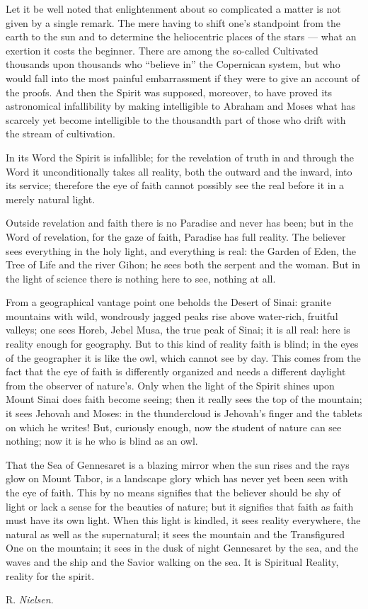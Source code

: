 \documentclass[12pt,a4paper,openany]{book}
\newcommand{\opage}[1]{\marginnote{\footnotesize\textit{[#1]}}}
\newcommand{\signature}[1]{\par\smallskip\hfill #1\hspace*{2em}\par}
\begin{document}
Let it be well noted that enlightenment about so
complicated a matter is not given by a single remark.
The mere having to shift one's standpoint from the earth
to the sun and to determine the heliocentric places of the stars
--- what an exertion it costs the beginner. There
are among the so-called Cultivated thousands upon thousands
who ``believe in'' the Copernican system, but who would
fall into the most painful embarrassment if they were to give
an account of the proofs. And then the Spirit was supposed, moreover,
\setcounter{footnote}{0}%
\opage{319}to have proved its astronomical infallibility by making
intelligible to Abraham and Moses what has scarcely yet
become intelligible to the thousandth part of those who
drift with the stream of cultivation.

In its Word the Spirit is infallible; for the revelation
of truth in and through the Word it unconditionally takes all
reality, both the outward and the inward, into
its service; therefore the eye of faith cannot possibly see the real
before it in a merely natural light.

Outside revelation and faith there is no Paradise
and never has been; but in the Word of revelation, for
the gaze of faith, Paradise has full reality. The believer
sees everything in the holy light, and everything is real: the Garden
of Eden, the Tree of Life and the river Gihon; he sees both
the serpent and the woman. But in the light of science there is
nothing here to see, nothing at all.

From a geographical vantage point one beholds the Desert of Sinai:
granite mountains with wild, wondrously jagged peaks rise
above water-rich, fruitful valleys; one sees Horeb,
Jebel Musa, the true peak of Sinai; it is all
real: here is reality enough for geography.
But to this kind of reality faith is blind; in
the eyes of the geographer it is like the owl, which cannot see by
day. This comes from the fact that the eye of faith is differently
organized and needs a different daylight from the observer of nature's.
Only when the light of the Spirit shines upon Mount
Sinai does faith become seeing; then it really sees the
top of the mountain; it sees Jehovah and Moses: in the thundercloud is
Jehovah's finger and the tablets on which he writes!
But, curiously enough, now the student of nature can see nothing;
now it is he who is blind as an owl.

\setcounter{footnote}{0}%
\opage{320}That the Sea of Gennesaret is a blazing mirror when the sun
rises and the rays glow on Mount Tabor, is a
landscape glory which has never yet been seen with the eye
of faith. This by no means signifies that the believer should be
shy of light or lack a sense for the beauties of nature; but it
signifies that faith as faith must have its own light.
When this light is kindled, it sees reality everywhere,
the natural as well as the supernatural; it sees
the mountain and the Transfigured One on the mountain; it sees in
the dusk of night Gennesaret by the sea, and the waves and
the ship and the Savior walking on the sea. It is Spiritual Reality,
reality for the spirit.
\signature{R. \emph{Nielsen}.}
\end{document}
